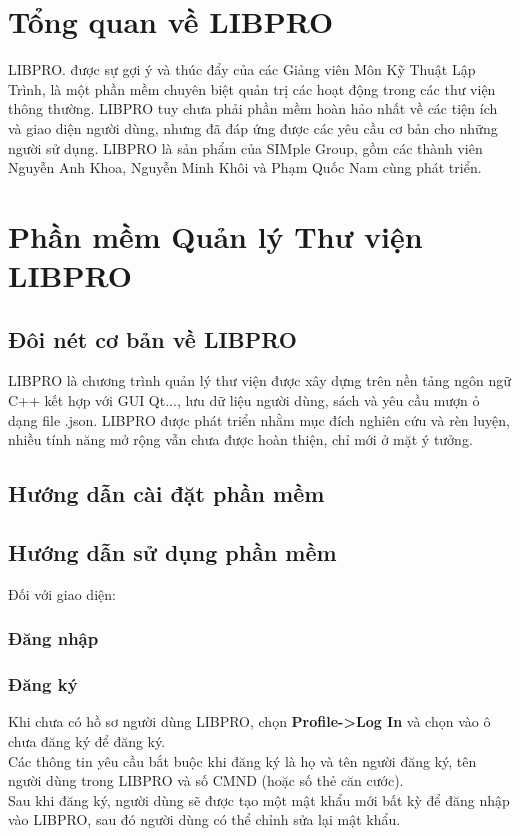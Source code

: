 \documentclass[12pt,a4paper]{report}
\begin{document}
\chapter{Tổng quan về LIBPRO}
LIBPRO. được sự gợi ý và thúc đẩy của các Giảng viên Môn Kỹ Thuật Lập Trình, là một phần mềm chuyên biệt quản trị các hoạt động trong các thư viện thông thường. LIBPRO tuy chưa phải phần mềm hoàn hảo nhất về các tiện ích và giao diện người dùng, nhưng đã đáp ứng được các yêu cầu cơ bản cho những người sử dụng. LIBPRO là sản phẩm của SIMple Group, gồm các thành viên Nguyễn Anh Khoa, Nguyễn Minh Khôi và Phạm Quốc Nam cùng phát triển.
\chapter{Phần mềm Quản lý Thư viện LIBPRO}
	\section{Đôi nét cơ bản về LIBPRO}
	LIBPRO là chương trình quản lý thư viện được xây dựng trên nền tảng ngôn ngữ C++ kết hợp với GUI Qt..., lưu dữ liệu người dùng, sách và yêu cầu mượn ỏ dạng file .json. LIBPRO được phát triển nhằm mục đích nghiên cứu và rèn luyện, nhiều tính năng mở rộng vẫn chưa được hoàn thiện, chỉ mới ở mặt ý tưởng.
	\section{Hướng dẫn cài đặt phần mềm}
	\section{Hướng dẫn sử dụng phần mềm}
		Đối với giao diện:
		\subsection{Đăng nhập}
			\subsection{Đăng ký}
			Khi chưa có hồ sơ người dùng LIBPRO, chọn \textbf{Profile->Log In} và chọn vào ô chưa đăng ký để đăng ký.\\
			Các thông tin yêu cầu bắt buộc khi đăng ký là họ và tên người đăng ký, tên người dùng trong LIBPRO và số CMND (hoặc số thẻ căn cước).\\
			Sau khi đăng ký, người dùng sẽ được tạo một mật khẩu mới bất kỳ để đăng nhập vào LIBPRO, sau đó người dùng có thể chỉnh sửa lại mật khẩu.\\
\end{document}
